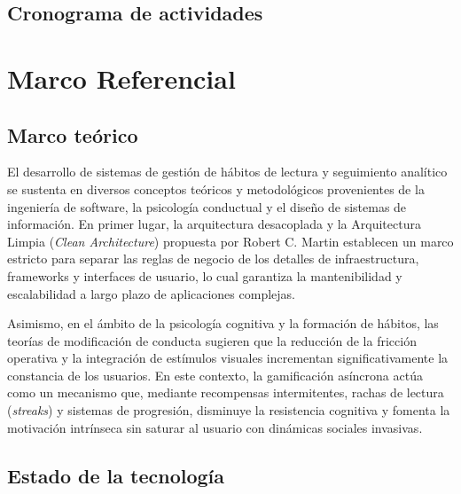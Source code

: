 \documentclass[12pt, atypical, journal]{article}
\begin{document}
\subsection*{Cronograma de actividades}


\section{Marco Referencial}

\subsection{Marco teórico}
El desarrollo de sistemas de gestión de hábitos de lectura y seguimiento analítico se sustenta en diversos conceptos teóricos y metodológicos provenientes de la ingeniería de software, la psicología conductual y el diseño de sistemas de información. En primer lugar, la arquitectura desacoplada y la Arquitectura Limpia (\textit{Clean Architecture}) propuesta por Robert C. Martin \cite{martin2018} establecen un marco estricto para separar las reglas de negocio de los detalles de infraestructura, frameworks y interfaces de usuario, lo cual garantiza la mantenibilidad y escalabilidad a largo plazo de aplicaciones complejas.

Asimismo, en el ámbito de la psicología cognitiva y la formación de hábitos, las teorías de modificación de conducta sugieren que la reducción de la fricción operativa y la integración de estímulos visuales incrementan significativamente la constancia de los usuarios. En este contexto, la gamificación asíncrona actúa como un mecanismo que, mediante recompensas intermitentes, rachas de lectura (\textit{streaks}) y sistemas de progresión, disminuye la resistencia cognitiva y fomenta la motivación intrínseca sin saturar al usuario con dinámicas sociales invasivas.

\subsection{Estado de la tecnología}
\end{document}

